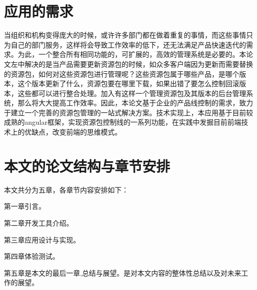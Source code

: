 \section{应用的需求}
当组织和机构变得庞大的时候，或许许多部门都在做着重复的事情，而这些事情只为自己的部门服务，这样将会导致工作效率的低下，还无法满足产品快速迭代的需求。为此，一个整合所有相同功能的，可扩展的，高效的管理系统是必要的。本论文左中解决的是当产品需要更新资源包的时候，如众多客户端因为更新而需要替换的资源包，如何对这些资源包进行管理呢？这些资源包属于哪些产品，是哪个版本，这个版本更新了什么，资源包要在哪里下载，如果出错了要怎么控制回滚版本，这些都可以进行整合处理。加入有这样一个管理资源包及其版本的后台管理系统，那么将大大提高工作效率。因此，本论文基于企业的产品线控制的需求，致力于建立一个完善的资源包管理的一站式解决方案。技术实现上，本应用基于目前较成熟的angular框架，实现资源包控制线的一系列功能，在实践中发掘目前前端技术上的优缺点，改变前端的思维模式。
\label{sec:require}
\label{sec:arrangement}
\section{本文的论文结构与章节安排}
\label{sec:arrangement}
本文共分为五章，各章节内容安排如下：

第一章引言。

第二章开发工具介绍。

第三章应用设计与实现。

第四章体验测试。

第五章是本文的最后一章,总结与展望。是对本文内容的整体性总结以及对未来工作的展望。

